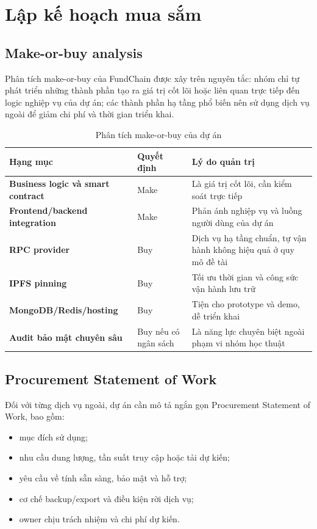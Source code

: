 \fi
\section{Lập kế hoạch mua sắm}

\subsection{Make-or-buy analysis}

Phân tích make-or-buy của FundChain được xây trên nguyên tắc: nhóm chỉ tự phát triển những thành phần tạo ra giá trị cốt lõi hoặc liên quan trực tiếp đến logic nghiệp vụ của dự án; các thành phần hạ tầng phổ biến nên sử dụng dịch vụ ngoài để giảm chi phí và thời gian triển khai.

\begin{table}[H]
\centering
\caption{Phân tích make-or-buy của dự án}
\label{tab:make-or-buy}
\begin{tabularx}{\textwidth}{| >{\bfseries}p{4.3cm} | p{2.5cm} | X |}
\hline
Hạng mục & Quyết định & Lý do quản trị \\
\hline
Business logic và smart contract & Make & Là giá trị cốt lõi, cần kiểm soát trực tiếp \\ \hline
Frontend/backend integration & Make & Phản ánh nghiệp vụ và luồng người dùng của dự án \\ \hline
RPC provider & Buy & Dịch vụ hạ tầng chuẩn, tự vận hành không hiệu quả ở quy mô đề tài \\ \hline
IPFS pinning & Buy & Tối ưu thời gian và công sức vận hành lưu trữ \\ \hline
MongoDB/Redis/hosting & Buy & Tiện cho prototype và demo, dễ triển khai \\ \hline
Audit bảo mật chuyên sâu & Buy nếu có ngân sách & Là năng lực chuyên biệt ngoài phạm vi nhóm học thuật \\
\hline
\end{tabularx}
\end{table}

\iffalse
\subsection{Procurement Statement of Work}

Đối với từng dịch vụ ngoài, dự án cần mô tả ngắn gọn Procurement Statement of Work, bao gồm:

\begin{itemize}
  \item mục đích sử dụng;
  \item nhu cầu dung lượng, tần suất truy cập hoặc tải dự kiến;
  \item yêu cầu về tính sẵn sàng, bảo mật và hỗ trợ;
  \item cơ chế backup/export và điều kiện rời dịch vụ;
  \item owner chịu trách nhiệm và chi phí dự kiến.
\end{itemize}

